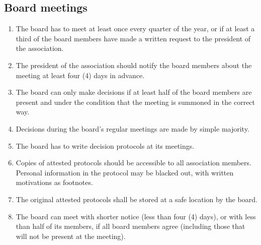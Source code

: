 \subsection{Board meetings}
\begin{enumerate}
  \item The board has to meet at least once every quarter of the year, or if at least a third of the board members have made a written request to the president of the association.
  \item The president of the association should notify the board members about the meeting at least four (4) days in advance.
  \item The board can only make decisions if at least half of the board members are present and under the condition that the meeting is summoned in the correct way.
  \item Decisions during the board's regular meetings are made by simple majority.
  \item The board has to write decision protocols at its meetings.
  \item Copies of attested protocols should be accessible to all association members. Personal information in the protocol may be blacked out, with written motivations as footnotes.
  \item The original attested protocols shall be stored at a safe location by the board.
  \item The board can meet with shorter notice (less than four (4) days), or with less than half of its members, if all board members agree (including those that will not be present at the meeting). 
\end{enumerate}

